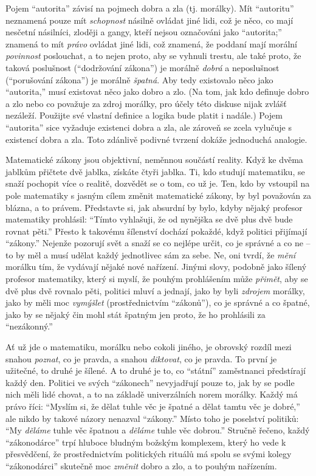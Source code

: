 \documentclass{book}
\begin{document}
Pojem \enquote{autorita} závisí na pojmech dobra a zla (tj. morálky). Mít \enquote{autoritu} neznamená pouze mít \emph{schopnost} násilně ovládat jiné lidi, což je něco, co mají nesčetní násilníci, zloději a gangy, kteří nejsou označováni jako \enquote{autorita;} znamená to mít \emph{právo} ovládat jiné lidi, což znamená, že poddaní mají morální \emph{povinnost} poslouchat, a to nejen proto, aby se vyhnuli trestu, ale také proto, že taková poslušnost (\enquote{dodržování zákona}) je morálně \emph{dobrá} a neposlušnost (\enquote{porušování zákona}) je morálně \emph{špatná}. Aby tedy existovalo něco jako \enquote{autorita,} musí existovat něco jako dobro a zlo. (Na tom, jak kdo definuje dobro a zlo nebo co považuje za zdroj morálky, pro účely této diskuse nijak zvlášť nezáleží. Použijte své vlastní definice a logika bude platit i nadále.) Pojem \enquote{autorita} sice vyžaduje existenci dobra a zla, ale zároveň se zcela vylučuje s existencí dobra a zla. Toto zdánlivě podivné tvrzení dokáže jednoduchá analogie.

Matematické zákony jsou objektivní, neměnnou součástí reality. Když ke dvěma jablkům přičtete dvě jablka, získáte čtyři jablka. Ti, kdo studují matematiku, se snaží pochopit více o realitě, dozvědět se o tom, co už je. Ten, kdo by vstoupil na pole matematiky s jasným cílem změnit matematické zákony, by byl považován za blázna, a to právem. Představte si, jak absurdní by bylo, kdyby nějaký profesor matematiky prohlásil: \enquote{Tímto vyhlašuji, že od nynějška se dvě plus dvě bude rovnat pěti.} Přesto k takovému šílenství dochází pokaždé, když politici přijímají \enquote{zákony.} Nejenže pozorují svět a snaží se co nejlépe určit, co je správné a co ne -- to by měl a musí udělat každý jednotlivec sám za sebe. Ne, oni tvrdí, že \emph{mění} morálku tím, že vydávají nějaké nové nařízení. Jinými slovy, podobně jako šílený profesor matematiky, který si myslí, že pouhým prohlášením může \emph{přimět}, aby se dvě plus dvě rovnalo pěti, politici mluví a jednají, jako by byli \emph{zdrojem} morálky, jako by měli moc \emph{vymýšlet} (prostřednictvím \enquote{zákonů}), co je správné a co špatné, jako by se nějaký čin mohl stát špatným jen proto, že ho prohlásili za \enquote{nezákonný.}

Ať už jde o matematiku, morálku nebo cokoli jiného, je obrovský rozdíl mezi snahou \emph{poznat}, co je pravda, a snahou \emph{diktovat}, co je pravda. To první je užitečné, to druhé je šílené. A to druhé je to, co \enquote{státní} zaměstnanci předstírají každý den. Politici ve svých \enquote{zákonech} nevyjadřují pouze to, jak by se podle nich měli lidé chovat, a to na základě univerzálních norem morálky. Každý má právo říci: \enquote{Myslím si, že dělat tuhle věc je špatné a dělat tamtu věc je dobré,} ale nikdo by takové názory nenazval \enquote{zákony.} Místo toho je poselství politiků: \enquote{My \emph{děláme} tuhle věc špatnou a \emph{děláme} tuhle věc dobrou.} Stručně řečeno, každý \enquote{zákonodárce} trpí hluboce bludným božským komplexem, který ho vede k přesvědčení, že prostřednictvím politických rituálů má spolu se svými kolegy \enquote{zákonodárci} skutečně moc \emph{změnit} dobro a zlo, a to pouhým nařízením.
\end{document}
